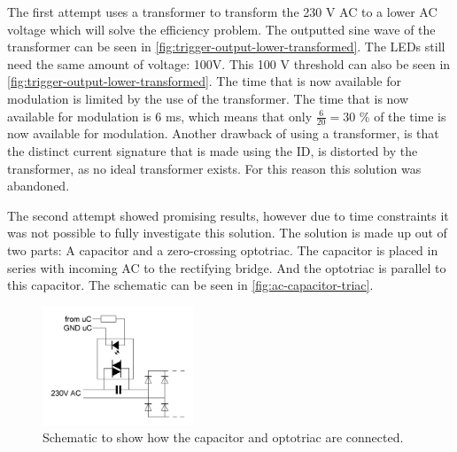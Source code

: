 	The first attempt uses a transformer to transform the 230 V AC to a lower AC voltage which will solve the efficiency problem.
	The outputted sine wave of the transformer can be seen in \autoref{fig:trigger-output-lower-transformed}.
	The LEDs still need the same amount of voltage: 100V.
	This 100 V threshold can also be seen in \autoref{fig:trigger-output-lower-transformed}.
	The time that is now available for modulation is limited by the use of the transformer.
	The time that is now available for modulation is 6 ms, which means that only $\frac{6}{20} = 30$ \% of the time is now available for modulation.
	Another drawback of using a transformer, is that the distinct current signature that is made using the ID, is distorted by the transformer, as no ideal transformer exists.
	For this reason this solution was abandoned.





	The second attempt showed promising results, however due to time constraints it was not possible to fully investigate this solution. 
	The solution is made up out of two parts: A capacitor and a zero-crossing optotriac.
	The capacitor is placed in series with incoming AC to the rectifying bridge.
	And the optotriac is parallel to this capacitor.
	The schematic can be seen in \autoref{fig:ac-capacitor-triac}.

	\begin{figure}[h]
		\centering
		\includegraphics[angle=0,width=0.4\textwidth]{chapters/hardware-chapters/AC/ac-modulator/custom-hardware/ac-current-source/ac-capacitor-triac.JPG}
		\caption{Schematic to show how the capacitor and optotriac are connected.}
		\label{fig:ac-capacitor-triac}
	\end{figure}

